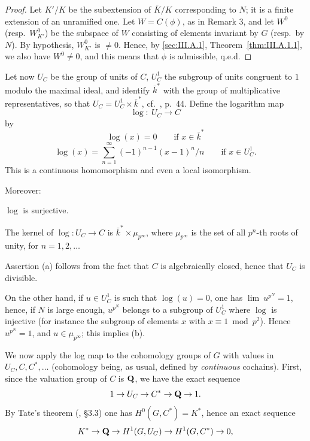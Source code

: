 \begin{proof}
Let $K'/K$ be the subextension of $\bar K/K$ corresponding to $N$; it
is a finite extension of an unramified one.  Let $W=C(\phi)$, as in
Remark 3, and let $W^0$ (resp.\ $W^0_{K'}$) be the subspace of $W$
consisting of elements invariant by $G$ (resp.\ by $N$).  By
hypothesis, $W^0_{K'}$ is $\neq 0$.  Hence, by \ref{sec:III.A.1},
Theorem~\ref{thm:III.A.1.1}, we also have $W^0\neq 0$, and this means
that $\phi$ is admissible, q.e.d.
\end{proof}

Let now $U_C$ be the group of units of $C$, $U^1_C$ the subgroup of
units congruent to $1$ modulo the maximal ideal, and identify
$\bar k^*$ with the group of multiplicative representatives, so that
$U_C=U^1_C\times\bar k^*$, cf.~\cite{serre-corps}, p.~44.  Define the
logarithm map
\[
\log\colon\ U_C \to C
\]
by
\[
\log(x)=0 \qquad\text{if } x\in\bar k^*
\]
\[
\log(x)=\sum_{n=1}^{\infty}(-1)^{n-1}(x-1)^n/n \qquad\text{if }
x\in U^1_C.
\]
This is a continuous homomorphism and even a local isomorphism.

Moreover:

\begin{lemma}
\begin{alist}
\item $\log$ is surjective.
\item The kernel of $\log\colon U_C\to C$ is
$\bar k^*\times\mu_{p^\infty}$, where $\mu_{p^\infty}$ is the set of all
$p^n$-th roots of unity, for $n=1,2,\ldots$
\end{alist}
\end{lemma}

Assertion (a) follows from the fact that $C$ is algebraically closed,
hence that $U_C$ is divisible.

On the other hand, if $u\in U^1_C$ is such that $\log(u)=0$, one has
$\lim\ u^{p^N}=1$, hence, if $N$ is large enough, $u^{p^N}$ belongs to
a subgroup of $U^1_C$ where $\log$ is injective (for instance the
subgroup of elements $x$ with $x\equiv 1 \bmod p^2$).  Hence
$u^{p^N}=1$, and $u\in\mu_{p^\infty}$; this implies (b).

We now apply the log map to the cohomology groups of $G$ with values in
$U_C, C, C^*,\ldots$ (cohomology being, as usual, defined by
\emph{continuous} cochains).  First, since the valuation group of $C$
is $\mathbf{Q}$, we have the exact sequence
\[
1\to U_C \to C^* \to \mathbf{Q} \to 1.
\]
By Tate's theorem (\cite{tate-pdiv}, \S3.3) one has $H^0(G,C^*)=K^*$,
hence an exact sequence
\[
K^* \to \mathbf{Q} \to H^1(G,U_C) \to H^1(G,C^*) \to 0,
\]

